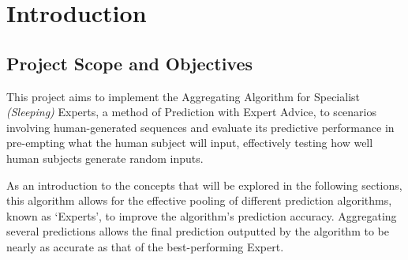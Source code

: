 \section{Introduction}\label{section:introduction}

\subsection{Project Scope and Objectives}
This project aims to implement the Aggregating Algorithm for Specialist \textit{(Sleeping)} Experts, a method of Prediction with Expert Advice, to scenarios involving human-generated sequences and evaluate its predictive performance in pre-empting what the human subject will input, effectively testing how well human subjects generate random inputs.

As an introduction to the concepts that will be explored in the following sections, this algorithm allows for the effective pooling of different prediction algorithms, known as `Experts', to improve the algorithm's prediction accuracy. Aggregating several predictions allows the final prediction outputted by the algorithm to be nearly as accurate as that of the best-performing Expert.

